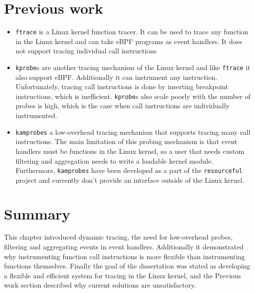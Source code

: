 \documentclass[12pt,twoside,notitlepage]{report}
\begin{document}

    \section{Previous work}
		\begin{itemize}
			\item \texttt{ftrace} is a Linux kernel function tracer. It can be used to trace any function in the Linux kernel and can take eBPF programs as event handlers. It does not support tracing individual call instructions

			\item \texttt{kprobe}s are another tracing mechanism of the Linux kernel and like \texttt{ftrace} it also support eBPF. Additionally it can instrument any instruction. Unfortunately, tracing call instructions is done by inserting breakpoint instructions, which is inefficient. \texttt{kprobe}s also scale poorly with the number of probes is high, which is the case when call instructions are individually instrumented.

			\item \texttt{kamprobes} a low-overhead tracing mechanism that supports tracing many call instructions. The main limitation of this probing mechanism is that event handlers must be functions in the Linux kernel, so a user that needs custom filtering and aggregation needs to write a loadable kernel module. Furthermore, \texttt{kamprobes} have been developed as a part of the \texttt{resourceful} project and currently don't provide an interface outside of the Linux kernel.
		\end{itemize}

	\section{Summary}

		This chapter introduced dynamic tracing, the need for low-overhead probes, filtering and aggregating events in event handlers. Additionally it demonstrated why instrumenting function call instructions is more flexible than instrumenting functions themselves. Finally the goal of the dissertation was stated as developing a flexible and efficient system for tracing in the Linux kernel, and the Previous work section described why current solutions are unsatisfactory.
\end{document}
